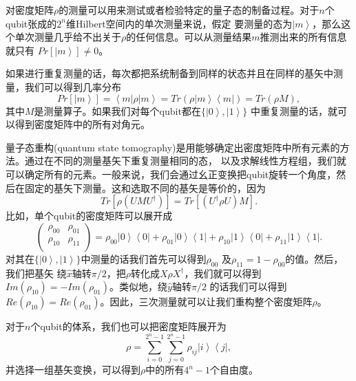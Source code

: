 对密度矩阵$\rho$的测量可以用来测试或者检验特定的量子态的制备过程。对于$n$个qubit张成的$2^n$维Hilbert空间内的单次测量来说，假定
要测量的态为$\left \vert m \right \rangle$，那么这个单次测量几乎给不出关于$\rho$的任何信息。可以从测量结果$m$推测出来的所有信息就只有
$Pr[\left \vert m \right \rangle]\neq 0$。

如果进行重复测量的话，每次都把系统制备到同样的状态并且在同样的基矢中测量，我们可以得到几率分布
\begin{equation}\label{aaa}
Pr[\left \vert m \right \rangle] =\left \langle m \right \vert \rho \left \vert m \right \rangle = Tr(\rho\left \vert m \right \rangle \left \langle m \right \vert) = Tr(\rho M),
\end{equation}
其中$M$是测量算子。如果我们对每个qubit都在$\{\left \vert 0 \right \rangle, \left \vert 1 \right \rangle\}$ 中重复测量的话，就可以得到密度矩阵中的所有对角元。

量子态重构(quantum state tomography)\cite{tomography1,tomography2,tomography3}是用能够确定出密度矩阵中所有元素的方法。通过在不同的测量基矢下重复测量相同的态，
以及求解线性方程组，我们就可以确定所有的元素。一般来说，我们会通过幺正变换把qubit旋转一个角度，然后在固定的基矢下测量。这和选取不同的基矢是等价的，因为
 \begin{equation}\label{aaa}
Tr[\rho (UMU^{\dagger})] = Tr[(U^{\dagger}\rho U)M].
\end{equation}
比如，单个qubit的密度矩阵可以展开成
 \begin{equation}\label{aaa}
\left(
  \begin{array}{cc}
    \rho_{00} & \rho_{01} \\
    \rho_{10} & \rho_{11} \\
  \end{array}
\right) = \rho_{00} \left \vert 0 \right \rangle \left \langle 0 \right \vert +\rho_{01} \left \vert 0 \right \rangle \left \langle 1 \right \vert+\rho_{10} \left \vert 1 \right \rangle \left \langle 0 \right \vert +\rho_{11} \left \vert 1 \right \rangle \left \langle 1 \right \vert.
\end{equation}
对其在$\{\left \vert 0 \right \rangle, \left \vert 1 \right \rangle\}$中测量的话我们首先可以得到$\rho_{00}$ 及$\rho_{11}=1-\rho_{00}$的值。然后，我们把基矢
绕$\hat{x}$轴转$\pi/2$，把$\rho$转化成$X\rho X^{\dagger}$，我们就可以得到$Im(\rho_{10}) = -Im(\rho_{01})$。类似地，绕$\hat{y}$轴转$\pi/2$ 的话我们可以得到$Re(\rho_{10}) = Re(\rho_{01})$。因此，三次测量就可以让我们重构整个密度矩阵$\rho$。

对于$n$个qubit的体系，我们也可以把密度矩阵展开为
\begin{equation}\label{aaa}
\rho = \sum_{i = 0}^{2^n-1}\sum_{j=0}^{2^n-1} \rho_{ij}\left \vert i \right \rangle \left \langle j \right \vert,
\end{equation}
并选择一组基矢变换，可以得到$\rho$中的所有$4^n-1$个自由度。

